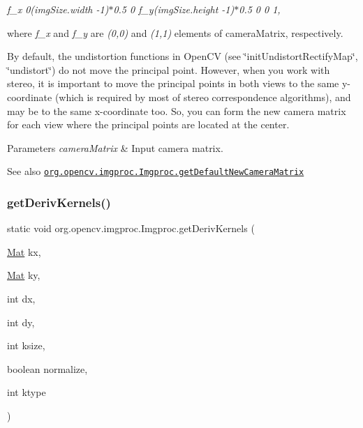 {\itshape f\+\_\+x 0(img\+Size.\+width -\/1)$\ast$0.5 0 f\+\_\+y(img\+Size.\+height -\/1)$\ast$0.5 0 0 1,}

where {\itshape f\+\_\+x} and {\itshape f\+\_\+y} are {\itshape (0,0)} and {\itshape (1,1)} elements of {\ttfamily camera\+Matrix}, respectively.

By default, the undistortion functions in Open\+CV (see \char`\"{}init\+Undistort\+Rectify\+Map\char`\"{}, \char`\"{}undistort\char`\"{}) do not move the principal point. However, when you work with stereo, it is important to move the principal points in both views to the same y-\/coordinate (which is required by most of stereo correspondence algorithms), and may be to the same x-\/coordinate too. So, you can form the new camera matrix for each view where the principal points are located at the center.


\begin{DoxyParams}{Parameters}
{\em camera\+Matrix} & Input camera matrix.\\
\hline
\end{DoxyParams}
\begin{DoxySeeAlso}{See also}
\href{http://docs.opencv.org/modules/imgproc/doc/geometric_transformations.html#getdefaultnewcameramatrix}{\tt org.\+opencv.\+imgproc.\+Imgproc.\+get\+Default\+New\+Camera\+Matrix} 
\end{DoxySeeAlso}
\mbox{\label{classorg_1_1opencv_1_1imgproc_1_1_imgproc_aad7100f31c477bc17ad6c868f16822f2}} 
\subsubsection{\texorpdfstring{get\+Deriv\+Kernels()}{getDerivKernels()}\hspace{0.1cm}{\footnotesize\ttfamily [1/2]}}
{\footnotesize\ttfamily static void org.\+opencv.\+imgproc.\+Imgproc.\+get\+Deriv\+Kernels (\begin{DoxyParamCaption}\item[{\mbox{\hyperlink{classorg_1_1opencv_1_1core_1_1_mat}{Mat}}}]{kx,  }\item[{\mbox{\hyperlink{classorg_1_1opencv_1_1core_1_1_mat}{Mat}}}]{ky,  }\item[{int}]{dx,  }\item[{int}]{dy,  }\item[{int}]{ksize,  }\item[{boolean}]{normalize,  }\item[{int}]{ktype }\end{DoxyParamCaption})\hspace{0.3cm}{\ttfamily [static]}}

